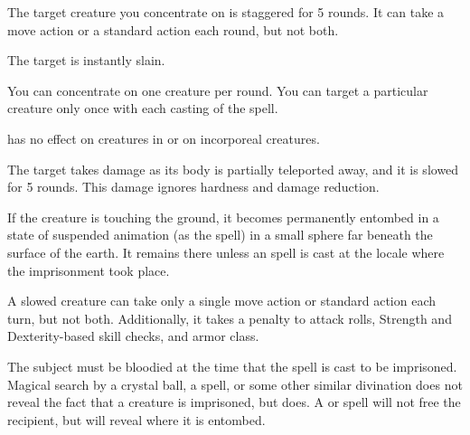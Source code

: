 \spellrng{\rngclose}
\begin{spellhealthy}
  The target creature you concentrate on is staggered for 5 rounds. It can take a move action or a standard action each round, but not both.
\end{spellhealthy}
\begin{spellblood}
  The target is instantly slain.
\end{spellblood}
\begin{spellnotes}
  You can concentrate on one creature per round. You can target a particular creature only once with each casting of the spell.
  \par {} has no effect on creatures in  or on incorporeal creatures.
\end{spellnotes}

\spellrng{\rngclose}
\begin{spelleffect}
  The target takes damage as its body is partially teleported away, and it is slowed for 5 rounds. This damage ignores hardness and damage reduction.
\end{spelleffect}
\begin{spellblood}
  If the creature is touching the ground, it becomes permanently entombed in a state of suspended animation (as the  spell) in a small sphere far beneath the surface of the earth. It remains there unless an  spell is cast at the locale where the imprisonment took place.
\end{spellblood}
\begin{spellnotes}
  A slowed creature can take only a single move action or standard action each turn, but not both. Additionally, it takes a  penalty to attack rolls, Strength and Dexterity-based skill checks, and armor class.

  The subject must be bloodied at the time that the spell is cast to be imprisoned. Magical search by a crystal ball, a  spell, or some other similar divination does not reveal the fact that a creature is imprisoned, but  does. A  or  spell will not free the recipient, but will reveal where it is entombed.
\end{spellnotes}

